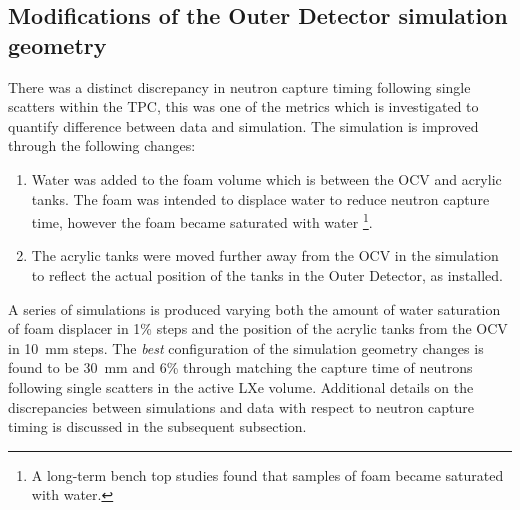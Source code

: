 \subsection{Modifications of the Outer Detector simulation geometry}\label{sec:VetoEff/GeometryEdits}
There was a distinct discrepancy in neutron capture timing following single scatters within the TPC, this was one of the metrics which is investigated to quantify difference between data and simulation.
The simulation is improved through the following changes:
\begin{enumerate}
	\item Water was added to the foam volume which is between the OCV and acrylic tanks. The foam was intended to displace water to reduce neutron capture time, however the foam became saturated with water \footnote{A long-term bench top studies found that samples of foam became saturated with water.}.
	\item The acrylic tanks were moved further away from the OCV in the simulation to reflect the actual position of the tanks in the Outer Detector, as installed.
\end{enumerate}
A series of simulations is produced varying both the amount of water saturation of foam displacer in 1\% steps and the position of the acrylic tanks from the OCV in 10~mm steps. The \textit{best} configuration of the simulation geometry changes is found to be 30~mm and 6\% through matching the capture time of neutrons following single scatters in the active LXe volume. Additional details on the discrepancies between simulations and data with respect to neutron capture timing is discussed in the subsequent subsection.
